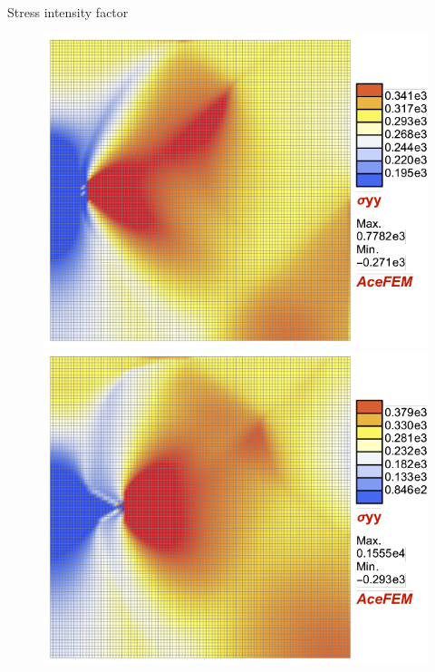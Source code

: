 \documentclass[aspectratio=169,xcolor=dvipsnames]{beamer}
\begin{document}
\begin{frame}{Stress intensity factor}
	\begin{figure}
	\begin{minipage}{0.35\linewidth}
		\begin{minipage}[c]{0.5\linewidth}
				\includegraphics[width=\linewidth]{sigmayy_L8.pdf}
		\end{minipage}\hfill
		\begin{minipage}[c]{0.5\linewidth}
				\includegraphics[width=\linewidth]{sigmayy_L4.pdf}
		\end{minipage}\hfill

\end{minipage}
\end{figure}
\end{frame}
\end{document}
